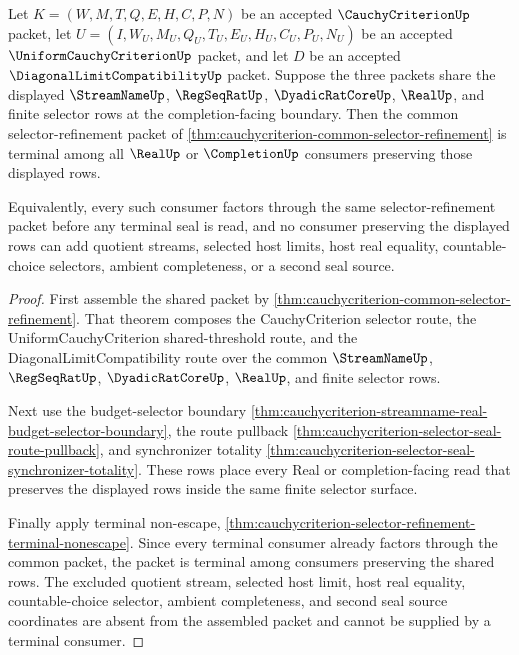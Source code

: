\begin{theorem}
\label{thm:cauchycriterion-diagonal-selector-terminality}
Let $K=(W,M,T,Q,E,H,C,P,N)$ be an accepted $\CauchyCriterionUp$ packet, let $U=(I,W_U,M_U,Q_U,T_U,E_U,H_U,C_U,P_U,N_U)$ be an accepted $\UniformCauchyCriterionUp$ packet, and let $D$ be an accepted $\DiagonalLimitCompatibilityUp$ packet. Suppose the three packets share the displayed $\StreamNameUp$, $\RegSeqRatUp$, $\DyadicRatCoreUp$, $\RealUp$, and finite selector rows at the completion-facing boundary. Then the common selector-refinement packet of \autoref{thm:cauchycriterion-common-selector-refinement} is terminal among all $\RealUp$ or $\CompletionUp$ consumers preserving those displayed rows.

Equivalently, every such consumer factors through the same selector-refinement packet before any terminal seal is read, and no consumer preserving the displayed rows can add quotient streams, selected host limits, host real equality, countable-choice selectors, ambient completeness, or a second seal source.
\end{theorem}
\begin{proof}
First assemble the shared packet by \autoref{thm:cauchycriterion-common-selector-refinement}. That theorem composes the CauchyCriterion selector route, the UniformCauchyCriterion shared-threshold route, and the DiagonalLimitCompatibility route over the common $\StreamNameUp$, $\RegSeqRatUp$, $\DyadicRatCoreUp$, $\RealUp$, and finite selector rows.

Next use the budget-selector boundary \autoref{thm:cauchycriterion-streamname-real-budget-selector-boundary}, the route pullback \autoref{thm:cauchycriterion-selector-seal-route-pullback}, and synchronizer totality \autoref{thm:cauchycriterion-selector-seal-synchronizer-totality}. These rows place every Real or completion-facing read that preserves the displayed rows inside the same finite selector surface.

Finally apply terminal non-escape, \autoref{thm:cauchycriterion-selector-refinement-terminal-nonescape}. Since every terminal consumer already factors through the common packet, the packet is terminal among consumers preserving the shared rows. The excluded quotient stream, selected host limit, host real equality, countable-choice selector, ambient completeness, and second seal source coordinates are absent from the assembled packet and cannot be supplied by a terminal consumer.
\end{proof}

